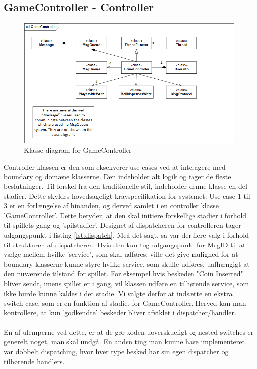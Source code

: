 \documentclass[Softwaredesign/Softwaredesign_main.tex]{subfiles}
\begin{document}
\subsection{GameController - Controller}
\begin{figure}[H]
    \centering
    \includegraphics[width=1\textwidth]{Softwaredesign/RPiApp/graphic_RPi/GC.png}
    \caption{Klasse diagram for GameController}
   \label{fig:cd_GC}
\end{figure}
Controller-klassen er den som eksekverer use cases ved at interagere med boundary og domæne klasserne. Den indeholder alt logik og tager de fleste beslutninger. Til forskel fra den traditionelle stil, indeholder denne klasse en del stadier. Dette skyldes hovedsageligt kravspecifikation for systemet: Use case 1 til 3 er en forlængelse af hinanden, og derved samlet i en controller klasse 'GameController'. Dette betyder, at den skal initiere forskellige stadier i forhold til spillets gang og 'spilstadier'. Designet af dispatcheren for controlleren tager udgangspunkt i listing \ref{lst:dispatch}. Med det sagt, så var der flere valg i forhold til strukturen af dispatcheren. Hvis den kun tog udgangspunkt for MsgID til at vælge mellem hvilke 'service', som skal udføres, ville det give mulighed for at boundary klasserne kunne styre hvilke service, som skulle udføres, uafhængigt at den nuværende tilstand for spillet. For eksempel hvis beskeden "Coin Inserted" bliver sendt, imens spillet er i gang, vil klassen udføre en tilhørende service, som ikke burde kunne kaldes i det stadie. Vi valgte derfor at indsætte en ekstra switch-case, som er en funktion af stadiet for GameController. Herved kan man kontrollere, at kun 'godkendte' beskeder bliver afviklet i dispatcher/handler. 
\\\\En af ulemperne ved dette, er at de gør koden uoverskueligt og nested switches er generelt noget, man skal undgå. En anden ting man kunne have implementeret var dobbelt dispatching, hvor hver type besked har sin egen dispatcher og tilhørende handlers.
\end{document}
